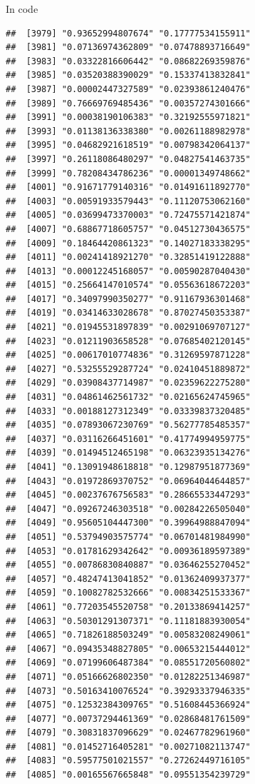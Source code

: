 \documentclass[ignorenonframetext,]{beamer}
\begin{document}
\begin{frame}[fragile]{In code}
\begin{verbatim}
##  [3979] "0.93652994807674" "0.17777534155911"
##  [3981] "0.07136974362809" "0.07478893716649"
##  [3983] "0.03322816606442" "0.08682269359876"
##  [3985] "0.03520388390029" "0.15337413832841"
##  [3987] "0.00002447327589" "0.02393861240476"
##  [3989] "0.76669769485436" "0.00357274301666"
##  [3991] "0.00038190106383" "0.32192555971821"
##  [3993] "0.01138136338380" "0.00261188982978"
##  [3995] "0.04682921618519" "0.00798342064137"
##  [3997] "0.26118086480297" "0.04827541463735"
##  [3999] "0.78208434786236" "0.00001349748662"
##  [4001] "0.91671779140316" "0.01491611892770"
##  [4003] "0.00591933579443" "0.11120753062160"
##  [4005] "0.03699473370003" "0.72475571421874"
##  [4007] "0.68867718605757" "0.04512730436575"
##  [4009] "0.18464420861323" "0.14027183338295"
##  [4011] "0.00241418921270" "0.32851419122888"
##  [4013] "0.00012245168057" "0.00590287040430"
##  [4015] "0.25664147010574" "0.05563618672203"
##  [4017] "0.34097990350277" "0.91167936301468"
##  [4019] "0.03414633028678" "0.87027450353387"
##  [4021] "0.01945531897839" "0.00291069707127"
##  [4023] "0.01211903658528" "0.07685402120145"
##  [4025] "0.00617010774836" "0.31269597871228"
##  [4027] "0.53255529287724" "0.02410451889872"
##  [4029] "0.03908437714987" "0.02359622275280"
##  [4031] "0.04861462561732" "0.02165624745965"
##  [4033] "0.00188127312349" "0.03339837320485"
##  [4035] "0.07893067230769" "0.56277785485357"
##  [4037] "0.03116266451601" "0.41774994959775"
##  [4039] "0.01494512465198" "0.06323935134276"
##  [4041] "0.13091948618818" "0.12987951877369"
##  [4043] "0.01972869370752" "0.06964044644857"
##  [4045] "0.00237676756583" "0.28665533447293"
##  [4047] "0.09267246303518" "0.00284226505040"
##  [4049] "0.95605104447300" "0.39964988847094"
##  [4051] "0.53794903575774" "0.06701481984990"
##  [4053] "0.01781629342642" "0.00936189597389"
##  [4055] "0.00786830840887" "0.03646255270452"
##  [4057] "0.48247413041852" "0.01362409937377"
##  [4059] "0.10082782532666" "0.00834251533367"
##  [4061] "0.77203545520758" "0.20133869414257"
##  [4063] "0.50301291307371" "0.11181883930054"
##  [4065] "0.71826188503249" "0.00583208249061"
##  [4067] "0.09435348827805" "0.00653215444012"
##  [4069] "0.07199606487384" "0.08551720560802"
##  [4071] "0.05166626802350" "0.01282251346987"
##  [4073] "0.50163410076524" "0.39293337946335"
##  [4075] "0.12532384309765" "0.51608445366924"
##  [4077] "0.00737294461369" "0.02868481761509"
##  [4079] "0.30831837096629" "0.02467782961960"
##  [4081] "0.01452716405281" "0.00271082113747"
##  [4083] "0.59577501021557" "0.27262449716105"
##  [4085] "0.00165567665848" "0.09551354239729"

\end{verbatim}
\end{frame}
\end{document}
